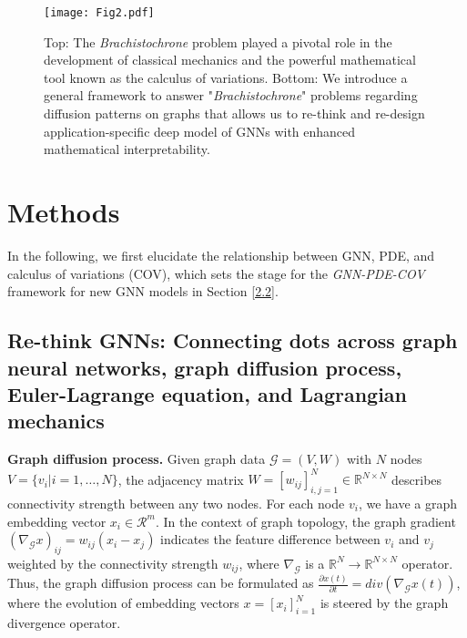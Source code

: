\documentclass{article}
\begin{document}
\begin{figure}[!t]
  \centering
  {\texttt{[image: Fig2.pdf]}}
  \caption{\small Top: The \textit{Brachistochrone} problem played a pivotal role in the development of classical mechanics and the powerful mathematical tool known as the calculus of variations. Bottom: We introduce a general framework to answer "\textit{Brachistochrone}" problems regarding diffusion patterns on graphs that allows us to re-think and re-design application-specific deep model of GNNs with enhanced mathematical interpretability.}
  \label{motivate}
  \vspace{-2.0em}
\end{figure}


\section{Methods}

In the following, we first elucidate the relationship between GNN, PDE, and calculus of variations (COV), which sets the stage for the \textit{GNN-PDE-COV} framework for new GNN models in Section \ref{2.2}.

\subsection{Re-think GNNs: Connecting dots across graph neural networks, graph diffusion process, Euler-Lagrange equation, and Lagrangian mechanics}
\label{2.1}
\textbf{Graph diffusion process.} Given graph data $\mathcal{G}=(V, W)$ with $N$ nodes $V=\{v_i |i=1,…,N\}$, the adjacency matrix $W=\left[w_{i j}\right]_{i, j=1}^N \in \mathbb{R}^{N \times N}$ describes connectivity strength between any two nodes. For each node $v_i$, we have a graph embedding vector $x_i \in \mathcal{R}^{m}$. In the context of graph topology, the graph gradient $\left(\nabla_{\mathcal{G}} x\right)_{i j}=w_{i j}\left(x_i-x_j\right)$ indicates the feature difference between $v_i$ and $v_j$ weighted by the connectivity strength $w_{ij}$, where $\nabla_{\mathcal{G}}$ is a $\mathbb{R}^N\rightarrow \mathbb{R}^{N\times N}$ operator. Thus, the graph diffusion process can be formulated as $\frac{\partial x(t)}{\partial t}=div \left(\nabla_\mathcal{G} x(t)\right)$, where the evolution of embedding vectors  $x=\left[x_i\right]_{i=1}^N$ is steered by the graph divergence operator.
\end{document}
